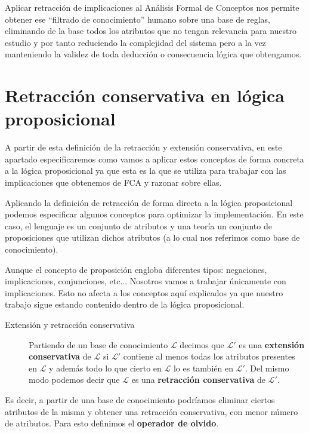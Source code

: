 	Aplicar retracción de implicaciones al Análisis Formal de Conceptos nos permite obtener ese ``filtrado de conocimiento'' humano sobre una base de reglas, eliminando de la base todos los atributos que no tengan relevancia para nuestro estudio y por tanto reduciendo la complejidad del sistema pero a la vez manteniendo la validez de toda deducción o consecuencia lógica que obtengamos.
	
	
\section*{Retracción conservativa en lógica proposicional}

	A partir de esta definición de la retracción y extensión conservativa, en este apartado especificaremos como vamos a aplicar estos conceptos de forma concreta a la lógica proposicional ya que esta es la que se utiliza para trabajar con las implicaciones que obtenemos de FCA y razonar sobre ellas.

	Aplicando la definición de retracción de forma directa a la lógica proposicional podemos especificar algunos conceptos para optimizar la implementación. En este caso, el lenguaje es un conjunto de atributos y una teoría un conjunto de proposiciones que utilizan dichos atributos (a lo cual nos referimos como base de conocimiento).
	
	Aunque el concepto de proposición engloba diferentes tipos: negaciones, implicaciones, conjunciones, etc... Nosotros vamos a trabajar únicamente con implicaciones. Esto no afecta a los conceptos aquí explicados ya que nuestro trabajo sigue estando contenido dentro de la lógica proposicional.
	
	\begin{description}
		\item[Extensión y retracción conservativa] 
			Partiendo de un base de conocimiento $\mathcal{L}$ decimos que $\mathcal{L'}$ es una \textbf{extensión conservativa} 
			de $\mathcal{L}$ si $\mathcal{L'}$ contiene al menos todas los atributos presentes en $\mathcal{L}$ y 
			además todo lo que cierto en $\mathcal{L}$ lo es también en $\mathcal{L'}$. Del mismo modo podemos decir que $\mathcal{L}$ es una \textbf{retracción conservativa} de $\mathcal{L'}$. 
	\end{description}

	 Es decir, a partir de una base de conocimiento podríamos eliminar ciertos atributos de la misma y obtener una retracción conservativa, con menor número de atributos. Para esto definimos el \textbf{operador de olvido}. 
	 
